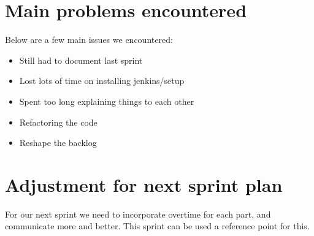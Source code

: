 \documentclass[11pt]{article}
\begin{document}
\newpage

\section*{Main problems encountered}

Below are a few main issues we encountered:
\begin{itemize}

	\item Still had to document last sprint

	\item Lost lots of time on installing jenkins/setup
	
	\item Spent too long explaining things to each other
	
	\item Refactoring the code
	
	\item Reshape the backlog

\end{itemize}

\section*{Adjustment for next sprint plan}

For our next sprint we need to incorporate overtime for each part, and communicate more and better. This sprint can be used a reference point for this.








	
\end{document}
